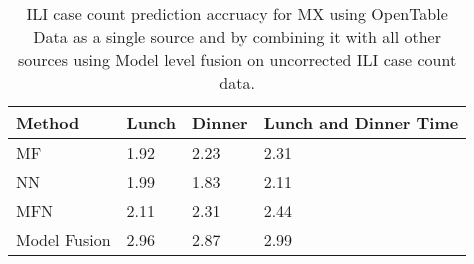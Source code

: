 \begin{table}[tb!]
\centering
\caption{\label{tb:opentable}  ILI case count prediction accruacy for MX using OpenTable Data as a single source and
by combining it with all other sources using Model level fusion on uncorrected ILI case count data.}
\vspace{1em}
\begin{tabular}{|p{1.5cm}|*{2}{l|}p{2cm}|}
\hline
Method& Lunch & Dinner & Lunch and Dinner Time \\
\hline \hline
MF   & 1.92 & 2.23 & 2.31 \\
NN   & 1.99 & 1.83 & 2.11 \\
MFN  & 2.11 & 2.31 & 2.44 \\
Model Fusion & 2.96 & 2.87 & 2.99 \\
\hline
\end{tabular}
\end{table}


